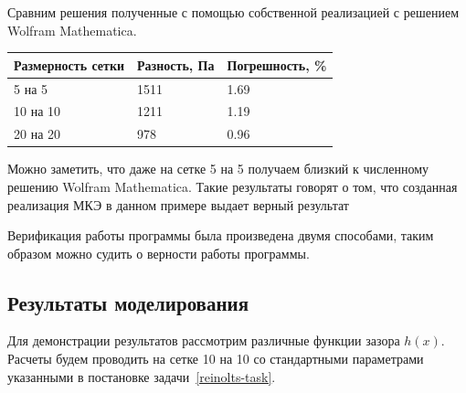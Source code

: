 \documentclass[a4paper,14pt]{extarticle}
\begin{document}
Сравним решения полученные с помощью собственной реализацией с решением Wolfram Mathematica.

\begin{table}[!htbp]
	\begin{tabular}{|l|l|l|}
		\hline
		\multicolumn{1}{|c|}{Размерность сетки} & \multicolumn{1}{c|}{Разность, Па} & Погрешность, \% \\ \hline
		5 на 5                                  & 1511	                              & 1.69            \\ \hline
		10 на 10                                & 1211                              & 1.19            \\ \hline
		20 на 20                                & 978                              & 0.96            \\ \hline
	\end{tabular}
\end{table}

Можно заметить, что даже на сетке 5 на 5 получаем близкий к численному решению Wolfram Mathematica. Такие результаты говорят о том, что созданная реализация МКЭ в данном примере выдает верный результат

Верификация работы программы была произведена двумя способами, таким образом можно судить о верности работы программы.

\subsection{Результаты моделирования}

Для демонстрации результатов рассмотрим различные функции зазора $h(x)$.  Расчеты будем проводить на сетке 10 на 10 со стандартными параметрами указанными в постановке задачи~\eqref{reinolts-task}.
\end{document}
